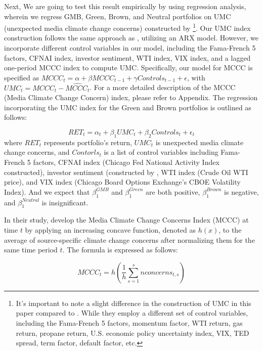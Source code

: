 \documentclass[12pt]{article}
\begin{document}
Next, We are going to test this result empirically by using regression analysis, wherein we regress GMB, Green, Brown, and Neutral portfolios on UMC (unexpected media climate change concerns) constructed by \cite{ardia2022climate}\footnote{It's important to note a slight difference in the construction of UMC in this paper compared to \cite{ardia2022climate}. While they employ a different set of control variables, including the Fama-French 5 factors, momentum factor, WTI return, gas return, propane return, U.S. economic policy uncertainty index, VIX, TED spread, term factor, default factor, etc.}. Our UMC index construction follows the same approach as \cite{ardia2022climate}, utilizing an ARX model. However, we incorporate different control variables in our model, including the Fama-French 5 factors, CFNAI index, investor sentiment, WTI index, VIX index, and a lagged one-period MCCC index to compute UMC. Specifically, our model for MCCC is specified as $MCCC_t = \alpha + \beta MCCC_{t-1} + \gamma Controls_{t-1} + \epsilon$, with $UMC_t = MCCC_t - \widehat{MCCC_t}$. For a more detailed description of the MCCC (Media Climate Change Concern) index, please refer to Appendix. The regression incorporating the UMC index for the Green and Brown portfolios is outlined as follows:

\begin{equation}
    RET_t = \alpha_t + \beta_1 UMC_t + \beta_2 Controls_t + \epsilon_t
\label{eqn: test_pastor_model}
\end{equation}
where $RET_t$ represents portfolio's return, $UMC_t$ is unexpected media climate change concerns, and $Contorls_t$ is a list of control variables including Fama-French 5 factors, CFNAI index (Chicago Fed National Activity Index constructed), investor sentiment (constructed by \cite{baker2007investor}, WTI index (Crude Oil WTI price), and VIX index (Chicago Board Options Exchange's CBOE Volatility Index). And we expect that $\beta^{GMB}_1$ and $\beta^{Green}_1$ are both positive, $\beta^{Brown}_1$ is negative, and $\beta^{Neutral}_1$ is insignificant.

In their study, \cite{ardia2022climate} develop the Media Climate Change Concerns Index (MCCC) at time $t$ by applying an increasing concave function, denoted as $h(x)$, to the average of source-specific climate change concerns after normalizing them for the same time period $t$. The formula is expressed as follows:

\begin{equation}
\label{mccc}
MCCC_t = h\left(\frac{1}{h}\sum^s_{s=1}nconcerns_{t,s} \right)
\end{equation}
\end{document}
